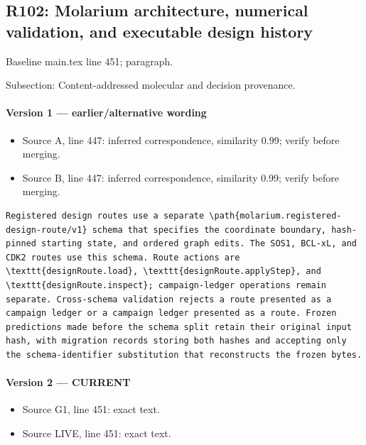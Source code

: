 \documentclass[11pt]{article}
\begin{document}
\subsection{R102: Molarium architecture, numerical validation, and executable design history}

Baseline main.tex line 451; paragraph.

Subsection: Content-addressed molecular and decision provenance.

\paragraph{Version 1 --- earlier/alternative wording}

\begin{itemize}[leftmargin=*]
\item Source A, line 447: inferred correspondence, similarity 0.99; verify before merging.
\item Source B, line 447: inferred correspondence, similarity 0.99; verify before merging.
\end{itemize}

\begin{lstlisting}
Registered design routes use a separate \path{molarium.registered-design-route/v1} schema that specifies the coordinate boundary, hash-pinned starting state, and ordered graph edits. The SOS1, BCL-xL, and CDK2 routes use this schema. Route actions are \texttt{designRoute.load}, \texttt{designRoute.applyStep}, and \texttt{designRoute.inspect}; campaign-ledger operations remain separate. Cross-schema validation rejects a route presented as a campaign ledger or a campaign ledger presented as a route. Frozen predictions made before the schema split retain their original input hash, with migration records storing both hashes and accepting only the schema-identifier substitution that reconstructs the frozen bytes.
\end{lstlisting}

\paragraph{Version 2 --- CURRENT}

\begin{itemize}[leftmargin=*]
\item Source G1, line 451: exact text.
\item Source LIVE, line 451: exact text.
\end{itemize}
\end{document}
